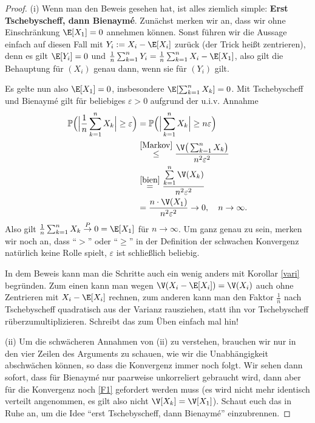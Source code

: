 \begin{proof}
	(i)  Wenn man den Beweis gesehen hat, ist alles ziemlich simple: \textbf{Erst Tschebyscheff, dann Bienaym\'e}. Zun\"achst merken wir an, dass wir ohne Einschr\"ankung $\E[X_1]=0$ annehmen k\"onnen. Sonst f\"uhren wir die Aussage einfach auf diesen Fall mit $Y_i:=X_i-\E[X_i]$ zur\"uck (der Trick hei\ss t zentrieren), denn es gilt $\E[Y_i]=0$ und $\frac{1}{n}\sum_{k=1}^n Y_i=\frac{1}{n}\sum_{k=1}^n X_i-\E[X_1]$, also gilt die Behauptung f\"ur $(X_i)$ genau dann, wenn sie f\"ur $(Y_i)$ gilt.\smallskip
	
	Es gelte nun also $\E[X_1]=0$, insbesondere $\E[\sum_{k=1}^nX_k]=0$. Mit Tschebyscheff und Bienaym\'e gilt f\"ur beliebiges $\varepsilon>0$ aufgrund der u.i.v. Annahme
		\begin{align*}
		\mathbb{P}\Big(\Big|\frac{1}{n} \sum\limits_{k=1}^{n} X_k\Big| \geq \varepsilon\Big)
		&=\mathbb{P}\Big(\Big| \sum\limits_{k=1}^{n} X_k\Big| \geq n \varepsilon\Big)\\
		&\overset{\ref{Markov}}{\leq} \frac{\V \big( \sum_{k=1}^n X_k\big) }{n^2\varepsilon^2}\\
		&\overset{\ref{bien}}{=} \frac{\sum\limits_{k=1}^{n} \V(X_k)}{n^2 \varepsilon^2}\\
		& = \frac{n \cdot \V(X_1)}{n^2 \varepsilon^2} \to 0, \quad n \to \infty.
		\end{align*}
		Also gilt $\frac{1}{n}\sum_{k=1}^n X_k\overset{P}{\rightarrow}0= \E[X_1]$ f\"ur $n\to\infty$. Um ganz genau zu sein, merken wir noch an, dass \enquote{$>$} oder \enquote{$\geq$} in der Definition der schwachen Konvergenz nat\"urlich keine Rolle spielt, $\varepsilon$ ist schlie\ss lich beliebig.\smallskip
		
		In dem Beweis kann man die Schritte auch ein wenig anders mit Korollar \ref{vari} begr\"unden. Zum einen kann man wegen $\V(X_i-\E[X_i])=\V(X_i)$ auch ohne Zentrieren mit $X_i-\E[X_i]$ rechnen, zum anderen kann man den Faktor $\frac 1 n$ nach Tschebyscheff quadratisch aus der Varianz rausziehen, statt ihn vor Tschebyscheff r\"uberzumultiplizieren. Schreibt das zum \"Uben einfach mal hin!\smallskip
		
		(ii) Um die schw\"acheren Annahmen von (ii) zu verstehen, brauchen wir nur in den vier Zeilen des Arguments zu schauen, wie wir die Unabh\"angigkeit abschw\"achen k\"onnen, so dass die Konvergenz immer noch folgt. Wir sehen dann sofort, dass f\"ur Bienaym\'e nur paarweise unkorreliert gebraucht wird, dann aber f\"ur die Konvergenz noch \eqref{F1} gefordert werden muss (es wird nicht mehr identisch verteilt angenommen, es gilt also nicht $\V[X_k]=\V[X_1]$). Schaut euch das in Ruhe an, um die Idee \enquote{erst Tschebyscheff, dann Bienaym\'e} einzubrennen.
\end{proof}

